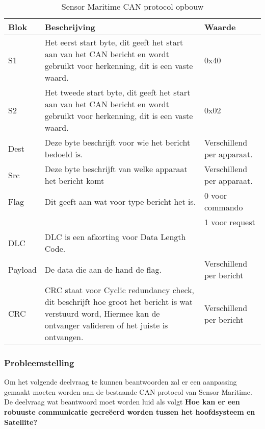 \begin{table}[h!]
	\caption{Sensor Maritime CAN protocol opbouw}
	\label{tab:cansensorprotocol}
	\begin{tabular}{p{1.5cm}p{10.5cm}p{3cm}}
	\toprule
	\textbf{Blok} & \textbf{Beschrijving} & \textbf{Waarde}\\ \midrule
	S1		& Het eerst start byte, dit geeft het start aan van het CAN bericht en wordt gebruikt voor herkenning, dit is een vaste waard.	& 0x40 \\
	S2		& Het tweede start byte, dit geeft het start aan van het CAN bericht en wordt gebruikt voor herkenning, dit is een vaste waard. & 0x02 \\
	Dest	& Deze byte beschrijft voor wie het bericht bedoeld is.		& Verschillend per apparaat. \\
	Src		& Deze byte beschrijft van welke apparaat het bericht komt	& Verschillend per apparaat.\\ 
	Flag	& Dit geeft aan wat voor type bericht het is.             & 0 voor commando \\ 
			& & 1 voor request \\ 
	DLC		& DLC is een afkorting voor Data Length Code.             & \\ 
	Payload	& De data die aan de hand de flag. & Verschillend per bericht\\
	CRC		& CRC staat voor Cyclic redundancy check, dit beschrijft hoe groot het bericht is wat verstuurd word, Hiermee kan de ontvanger valideren of het juiste is ontvangen. & Verschillend per bericht\\ \bottomrule
	\end{tabular}
\end{table}

\subsubsection{Probleemstelling}
Om het volgende deelvraag te kunnen beantwoorden zal er een aanpassing gemaakt moeten worden aan de bestaande CAN protocol van Sensor Maritime. De deelvraag wat beantwoord moet worden luid als volgt \textbf{Hoe kan er een robuuste  communicatie gecreëerd worden tussen het hoofdsysteem en Satellite?}